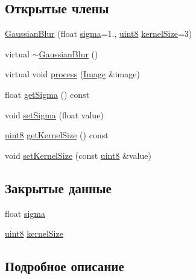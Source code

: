 \subsection*{Открытые члены}
\begin{DoxyCompactItemize}
\item 
\hyperlink{class_gaussian_blur_a673756a20ccaacc46de77e6c355276d2}{Gaussian\+Blur} (float \hyperlink{class_gaussian_blur_ab43cc1fff30574e2e04876fda4a55441}{sigma}=1., \hyperlink{number_8h_adde6aaee8457bee49c2a92621fe22b79}{uint8} \hyperlink{class_gaussian_blur_ab71bceac5e6b8f3f2d2868f40ff0f80b}{kernel\+Size}=3)
\item 
virtual \hyperlink{class_gaussian_blur_a881b005db6cc737bf1d6a8ab3d32c6b1}{$\sim$\+Gaussian\+Blur} ()
\item 
virtual void \hyperlink{class_gaussian_blur_a6af6684bdf5e86e5c9a79fe1f3a8c183}{process} (\hyperlink{class_image}{Image} \&image)
\item 
float \hyperlink{class_gaussian_blur_a409c05410353b2bb7abfa0ac0e7e2279}{get\+Sigma} () const 
\item 
void \hyperlink{class_gaussian_blur_aa4203a493fb56be7dec2af1e90667af1}{set\+Sigma} (float value)
\item 
\hyperlink{number_8h_adde6aaee8457bee49c2a92621fe22b79}{uint8} \hyperlink{class_gaussian_blur_a47c6c015416e7f0770d2990beb85a48c}{get\+Kernel\+Size} () const 
\item 
void \hyperlink{class_gaussian_blur_ad8b1e0c74123f050daa79d20c3636064}{set\+Kernel\+Size} (const \hyperlink{number_8h_adde6aaee8457bee49c2a92621fe22b79}{uint8} \&value)
\end{DoxyCompactItemize}
\subsection*{Закрытые данные}
\begin{DoxyCompactItemize}
\item 
float \hyperlink{class_gaussian_blur_ab43cc1fff30574e2e04876fda4a55441}{sigma}
\item 
\hyperlink{number_8h_adde6aaee8457bee49c2a92621fe22b79}{uint8} \hyperlink{class_gaussian_blur_ab71bceac5e6b8f3f2d2868f40ff0f80b}{kernel\+Size}
\end{DoxyCompactItemize}


\subsection{Подробное описание}



